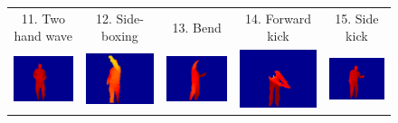 \documentclass[final,3p,times,twocolumn]{elsarticle}
\begin{document}
\begin{figure}[ht]
{\begin{tabular}{ccccc}
		         11. Two hand wave &          12. Side-boxing &         13. Bend &          14. Forward kick &          15. Side kick\\
		
		         \includegraphics[width=0.4\columnwidth]{Figures/MSRAction3D_jogging.pdf} &		
		         \includegraphics[width=0.4\columnwidth]{Figures/MSRAction3D_tennisswing.pdf} &          \includegraphics[width=0.4\columnwidth]{Figures/MSRAction3D_tennisserve.pdf} &          \includegraphics[width=0.4\columnwidth]{Figures/MSRAction3D_golfswing.pdf} &          \includegraphics[width=0.4\columnwidth]{Figures/MSRAction3D_pickupandthrow.pdf} \\
		

\end{tabular}}
\end{figure}
\end{document}
